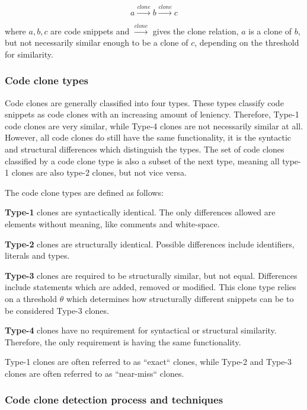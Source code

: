 \documentclass[12pt]{article}
\begin{document}
$$a \xrightarrow{clone} b \xrightarrow{clone} c$$

where $a,b,c$ are code snippets and $\xrightarrow{clone}$ gives the clone relation, $a$ is
a clone of $b$, but not necessarily similar enough to be a clone of $c$, depending on the
threshold for similarity.

\subsubsection{Code clone types}

Code clones are generally classified into four types\cite{Inoue_introduction_to_cc}. These
types classify code snippets as code clones with an increasing amount of leniency.
Therefore, Type-1 code clones are very similar, while Type-4 clones are not necessarily
similar at all. However, all code clones do still have the same functionality, it is the
syntactic and structural differences which distinguish the types. The set of code clones
classified by a code clone type is also a subset of the next type, meaning all type-1
clones are also type-2 clones, but not vice versa.

The code clone types are defined as follows:

\textbf{Type-1} clones are syntactically identical. The only differences allowed are elements
without meaning, like comments and white-space.

\textbf{Type-2} clones are structurally identical. Possible differences include
identifiers, literals and types.

\textbf{Type-3} clones are required to be structurally similar, but not equal. Differences
include statements which are added, removed or modified. This clone type relies on a
threshold $\theta$ which determines how structurally different snippets can be
to be considered Type-3 clones\cite{Inoue_introduction_to_cc}.

\textbf{Type-4} clones have no requirement for syntactical or structural similarity. Therefore,
the only requirement is having the same functionality.

Type-1 clones are often referred to as ``exact`` clones, while Type-2 and Type-3 clones are
often referred to as ``near-miss`` clones\cite[1]{Zibran_real_time_search}.

\subsubsection{Code clone detection process and techniques}
\end{document}
